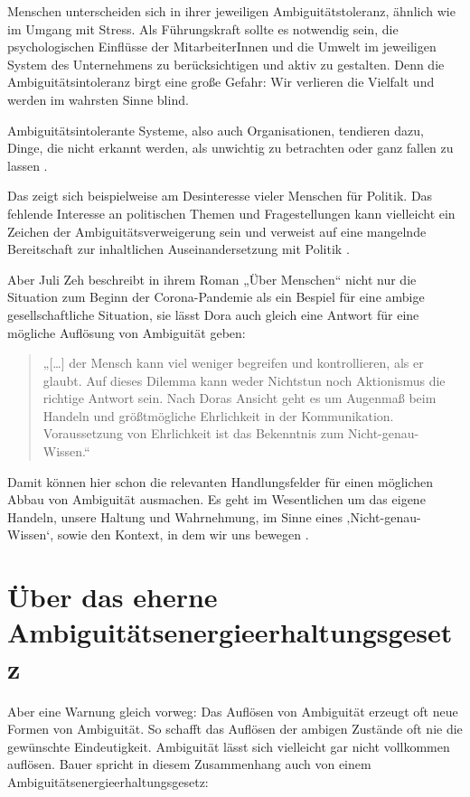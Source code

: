 \documentclass[
  ngerman,
  letterpaper,
  DIV=11]{scrartcl}
\begin{document}
Menschen unterscheiden sich in ihrer jeweiligen Ambiguitätstoleranz,
ähnlich wie im Umgang mit Stress. Als Führungskraft sollte es notwendig
sein, die psychologischen Einflüsse der MitarbeiterInnen und die Umwelt
im jeweiligen System des Unternehmens zu berücksichtigen und aktiv zu
gestalten. Denn die Ambiguitätsintoleranz birgt eine große Gefahr: Wir
verlieren die Vielfalt und werden im wahrsten Sinne blind.

Ambiguitätsintolerante Systeme, also auch Organisationen, tendieren
dazu, Dinge, die nicht erkannt werden, als unwichtig zu betrachten oder
ganz fallen zu lassen \autocite[54]{bauer2018}.

Das zeigt sich beispielweise am Desinteresse vieler Menschen für
Politik. Das fehlende Interesse an politischen Themen und
Fragestellungen kann vielleicht ein Zeichen der Ambiguitätsverweigerung
sein und verweist auf eine mangelnde Bereitschaft zur inhaltlichen
Auseinandersetzung mit Politik \autocite[13 und 25]{bauer2018}.

Aber Juli Zeh beschreibt in ihrem Roman „Über Menschen`` nicht nur die
Situation zum Beginn der Corona-Pandemie als ein Bespiel für eine ambige
gesellschaftliche Situation, sie lässt Dora auch gleich eine Antwort für
eine mögliche Auflösung von Ambiguität geben:

\begin{quote}
„{[}\ldots{]} der Mensch kann viel weniger begreifen und kontrollieren,
als er glaubt. Auf dieses Dilemma kann weder Nichtstun noch Aktionismus
die richtige Antwort sein. Nach Doras Ansicht geht es um Augenmaß beim
Handeln und größtmögliche Ehrlichkeit in der Kommunikation.
Voraussetzung von Ehrlichkeit ist das Bekenntnis zum
Nicht-genau-Wissen.``
\end{quote}

Damit können hier schon die relevanten Handlungsfelder für einen
möglichen Abbau von Ambiguität ausmachen. Es geht im Wesentlichen um das
eigene Handeln, unsere Haltung und Wahrnehmung, im Sinne eines
‚Nicht-genau-Wissen`, sowie den Kontext, in dem wir uns bewegen
\autocite[vgl.][]{kozica2025}.

\section{Über das eherne
Ambiguitätsenergieerhaltungsgesetz}\label{uxfcber-das-eherne-ambiguituxe4tsenergieerhaltungsgesetz}

Aber eine Warnung gleich vorweg: Das Auflösen von Ambiguität erzeugt oft
neue Formen von Ambiguität. So schafft das Auflösen der ambigen Zustände
oft nie die gewünschte Eindeutigkeit. Ambiguität lässt sich vielleicht
gar nicht vollkommen auflösen. Bauer spricht in diesem Zusammenhang auch
von einem Ambiguitätsenergieerhaltungsgesetz:
\end{document}
